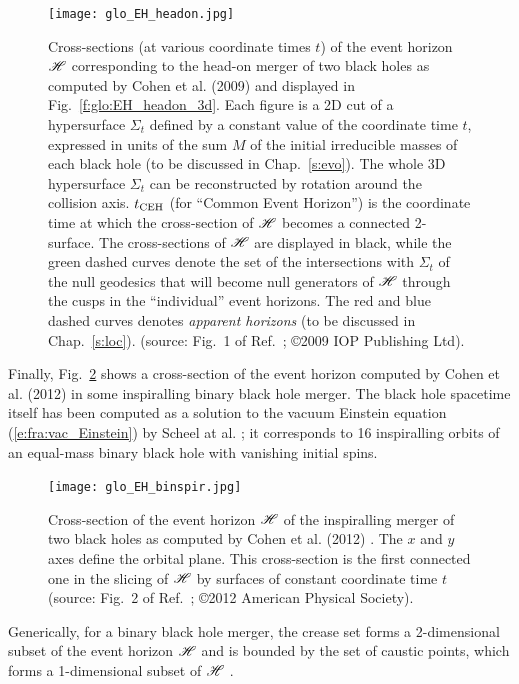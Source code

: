 \begin{figure}
\centerline{\texttt{[image: glo\_EH\_headon.jpg]}}
\caption[]{\label{f:glo:EH_headon} \footnotesize
Cross-sections (at various coordinate times $t$) of the event horizon $\mathscr{H}$ corresponding
to the head-on merger of two black holes as computed by Cohen et al. (2009) \cite{CohenPS09}
and displayed in Fig.~\ref{f:glo:EH_headon_3d}.
Each figure is a 2D cut of a hypersurface $\Sigma_t$ defined by a constant
value of the coordinate time $t$, expressed in units of the sum $M$ of the
initial irreducible masses of each black
hole (to be discussed in Chap.~\ref{s:evo}). The whole 3D hypersurface $\Sigma_t$ can be reconstructed
by rotation around the collision axis.
$t_{\rm CEH}$ (for ``Common Event Horizon'')
is the coordinate time at which the cross-section of $\mathscr{H}$ becomes a connected
2-surface.
The cross-sections of $\mathscr{H}$ are displayed
in black, while the green dashed curves denote the set of the intersections
with $\Sigma_t$ of the null geodesics that
will become null generators of $\mathscr{H}$ through the cusps in the
``individual'' event horizons.
The red and blue dashed curves denotes \emph{apparent horizons} (to be discussed in
Chap.~\ref{s:loc}).
(source: Fig.~1 of Ref.~\cite{CohenPS09}; \copyright  2009 IOP Publishing Ltd).}
\end{figure}

Finally, Fig.~\ref{f:glo:EH_binspir} shows a cross-section
of the event horizon computed by Cohen et al. (2012) \cite{CohenKS12}
in some inspiralling binary black hole merger. The
black hole spacetime itself has been computed as a solution to the vacuum
Einstein equation (\ref{e:fra:vac_Einstein}) by Scheel at al. \cite{ScheeBCKMP09}; it corresponds to
16 inspiralling orbits of an equal-mass binary black hole with vanishing initial
spins.

\begin{figure}
\centerline{\texttt{[image: glo\_EH\_binspir.jpg]}}
\caption[]{\label{f:glo:EH_binspir} \footnotesize
Cross-section of the event horizon $\mathscr{H}$ of the inspiralling merger of
two black holes as computed by Cohen et al. (2012) \cite{CohenKS12}.
The $x$ and $y$ axes define the orbital plane.
This cross-section is the first connected one in the slicing of $\mathscr{H}$
by surfaces of constant coordinate time $t$
(source: Fig.~2 of Ref.~\cite{CohenKS12}; \copyright 2012 American Physical Society).}
\end{figure}

Generically, for a binary black hole merger,
the crease set forms a 2-dimensional subset of the event horizon
$\mathscr{H}$ and is bounded by the set of caustic points, which forms a 1-dimensional
subset of $\mathscr{H}$ \cite{Siino98a,Siino98b,HusaW99,CohenKS12}.


